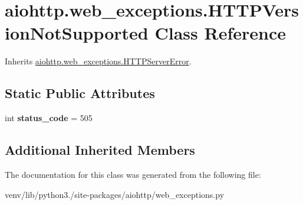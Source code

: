\hypertarget{classaiohttp_1_1web__exceptions_1_1_h_t_t_p_version_not_supported}{}\section{aiohttp.\+web\+\_\+exceptions.\+H\+T\+T\+P\+Version\+Not\+Supported Class Reference}
\label{classaiohttp_1_1web__exceptions_1_1_h_t_t_p_version_not_supported}


Inherits \hyperlink{classaiohttp_1_1web__exceptions_1_1_h_t_t_p_server_error}{aiohttp.\+web\+\_\+exceptions.\+H\+T\+T\+P\+Server\+Error}.

\subsection*{Static Public Attributes}
\begin{DoxyCompactItemize}
\item 
\mbox{\label{classaiohttp_1_1web__exceptions_1_1_h_t_t_p_version_not_supported_a4ba6fb0502318d9684cd0809cfd921ad}} 
int {\bfseries status\+\_\+code} = 505
\end{DoxyCompactItemize}
\subsection*{Additional Inherited Members}


The documentation for this class was generated from the following file\+:\begin{DoxyCompactItemize}
\item 
venv/lib/python3./site-\/packages/aiohttp/web\+\_\+exceptions.\+py\end{DoxyCompactItemize}
